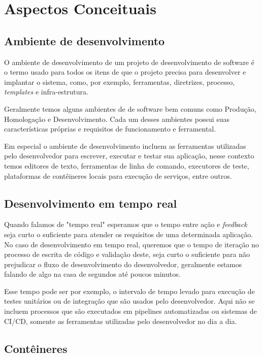 \chapter{Aspectos Conceituais}
    
    \section{Ambiente de desenvolvimento}
    
    O ambiente de desenvolvimento de um projeto de desenvolvimento de software é o termo usado para todos os itens de que o projeto precisa para desenvolver e implantar o sistema, como, por exemplo, ferramentas, diretrizes, processo, \textit{templates} e infra-estrutura.\cite{ambientedev}
    
    Geralmente temos alguns ambientes de de software bem comuns como Produção, Homologação e Desenvolvimento. Cada um desses ambientes possui suas características próprias e requisitos de funcionamento e ferramental.
    
    Em especial o ambiente de desenvolvimento incluem as ferramentas utilizadas pelo desenvolvedor para escrever, executar e testar sua aplicação, nesse contexto temos editores de texto, ferramentas de linha de comando, executores de teste, plataformas de contêineres locais para execução de serviços, entre outros.
    
    \section{Desenvolvimento em tempo real} %
    
    Quando falamos de "tempo real" esperamos que o tempo entre ação e \textit{feedback} seja curto o suficiente para atender os requisitos de uma determinada aplicação. No caso de desenvolvimento em tempo real, queremos que o tempo de iteração no processo de escrita de código e validação deste, seja curto o suficiente para não prejudicar o fluxo de desenvolvimento do desenvolvedor, geralmente estamos falando de algo na casa de segundos até poucos minutos.
    
    Esse tempo pode ser por exemplo, o intervalo de tempo levado para execução de testes unitários ou de integração que são usados pelo desenvolvedor. Aqui não se incluem processos que são executados em pipelines automatizadas ou sistemas de CI/CD, somente as ferramentas utilizadas pelo desenvolvedor no dia a dia.
    
    \section{Contêineres} %
